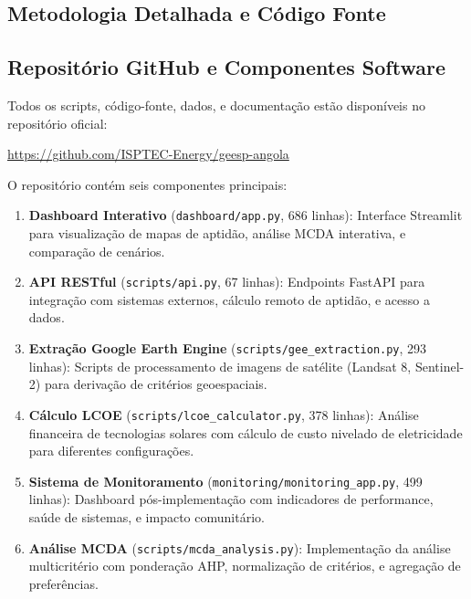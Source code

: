 \documentclass[12pt, a4paper]{article}
\begin{document}
\begin{itemize}
\section{Metodologia Detalhada e Código Fonte}

\subsection{Repositório GitHub e Componentes Software}

Todos os scripts, código-fonte, dados, e documentação estão disponíveis no repositório oficial:

\begin{center}
\url{https://github.com/ISPTEC-Energy/geesp-angola}
\end{center}

O repositório contém seis componentes principais:

\begin{enumerate}
    \item \textbf{Dashboard Interativo} (\texttt{dashboard/app.py}, 686 linhas): Interface Streamlit para visualização de mapas de aptidão, análise MCDA interativa, e comparação de cenários.
    
    \item \textbf{API RESTful} (\texttt{scripts/api.py}, 67 linhas): Endpoints FastAPI para integração com sistemas externos, cálculo remoto de aptidão, e acesso a dados.
    
    \item \textbf{Extração Google Earth Engine} (\texttt{scripts/gee\_extraction.py}, 293 linhas): Scripts de processamento de imagens de satélite (Landsat 8, Sentinel-2) para derivação de critérios geoespaciais.
    
    \item \textbf{Cálculo LCOE} (\texttt{scripts/lcoe\_calculator.py}, 378 linhas): Análise financeira de tecnologias solares com cálculo de custo nivelado de eletricidade para diferentes configurações.
    
    \item \textbf{Sistema de Monitoramento} (\texttt{monitoring/monitoring\_app.py}, 499 linhas): Dashboard pós-implementação com indicadores de performance, saúde de sistemas, e impacto comunitário.
    
    \item \textbf{Análise MCDA} (\texttt{scripts/mcda\_analysis.py}): Implementação da análise multicritério com ponderação AHP, normalização de critérios, e agregação de preferências.
\end{enumerate}


\end{itemize}
\end{document}
